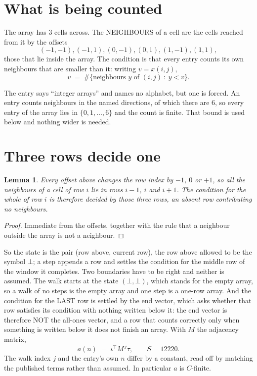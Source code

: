 \documentclass[11pt,a4paper]{article}
\theoremstyle{plain}
\newtheorem{lemma}[theorem]{Lemma}
\theoremstyle{definition}
\begin{document}
\section{What is being counted}

The array has $3$ cells across. The NEIGHBOURS of a cell are the cells reached from it by the
offsets
\[
(-1,-1), (-1,1), (0,-1), (0,1), (1,-1), (1,1),
\]
those that lie inside the array. The condition is that every entry counts its own neighbours
that are smaller than it: writing $v=x(i,j)$,
\[
v\;=\;\#\{\text{neighbours } y \text{ of } (i,j)\ :\ y<v\} .
\]

The entry says ``integer arrays'' and names no alphabet, but one is forced. An entry counts
neighbours in the named directions, of which there are $6$, so every entry of the array
lies in $\{0,1,\dots,6\}$ and the count is finite. That bound is used below and
nothing wider is needed.

\section{Three rows decide one}

\begin{lemma}\label{lem:win}
Every offset above changes the row index by $-1$, $0$ or $+1$, so all the neighbours of a cell
of row $i$ lie in rows $i-1$, $i$ and $i+1$. The condition for the whole of row $i$ is
therefore decided by those three rows, an absent row contributing no neighbours.
\end{lemma}

\begin{proof}
Immediate from the offsets, together with the rule that a neighbour outside the array is not a
neighbour.
\end{proof}

So the state is the pair (row above, current row), the row above allowed to be the symbol
$\bot$; a step appends a row and settles the condition for the middle row of the window it
completes. Two boundaries have to be right and neither is assumed. The walk starts at the state
$(\bot,\bot)$, which stands for the empty array, so a walk of no steps is the empty array and
one step is a one-row array. And the condition for the LAST row is settled by the end vector,
which asks whether that row satisfies its condition with nothing written below it: the end
vector is therefore NOT the all-ones vector, and a row that counts correctly only when
something is written below it does not finish an array. With $M$ the adjacency matrix,
\[
a(n)\;=\;\iota^{\!\top}M^{\,j}\tau ,\qquad S=12220.
\]
The walk index $j$ and the entry's own $n$ differ by a constant, read off by matching the
published terms rather than assumed. In particular $a$ is $C$-finite.
\end{document}
